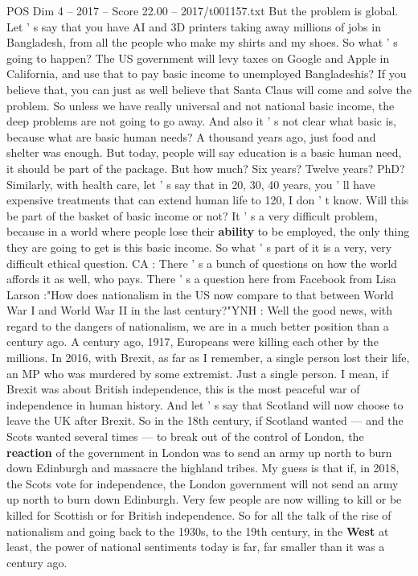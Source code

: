 \begin{textsample}{POS Dim 4 – 2017 – Score 22.00 – 2017/t001157.txt}
But the problem is global.
Let ' s say that you have AI and 3D printers taking away millions of jobs in Bangladesh, from all the people who make my shirts and my shoes.
So what ' s going to happen?
The US government will levy taxes on Google and Apple in California, and use that to pay basic income to unemployed Bangladeshis?
If you believe that, you can just as well believe that Santa Claus will come and solve the problem.
So unless we have really universal and not national basic income, the deep problems are not going to go away.
And also it ' s not clear what basic is, because what are basic human needs?
A thousand years ago, just food and shelter was enough.
But today, people will say education is a basic human need, it should be part of the package.
But how much?
Six years?
Twelve years?
PhD?
Similarly, with health care, let ' s say that in 20, 30, 40 years, you ' ll have expensive treatments that can extend human life to 120, I don ' t know.
Will this be part of the basket of basic income or not?
It ' s a very difficult problem, because in a world where people lose their \textbf{ability} to be employed, the only thing they are going to get is this basic income.
So what ' s part of it is a very, very difficult ethical question.
CA : There ' s a bunch of questions on how the world affords it as well, who pays.
There ' s a question here from Facebook from Lisa Larson :"How does nationalism in the US now compare to that between World War I and World War II in the last century?"YNH : Well the good news, with regard to the dangers of nationalism, we are in a much better position than a century ago.
A century ago, 1917, Europeans were killing each other by the millions.
In 2016, with Brexit, as far as I remember, a single person lost their life, an MP who was murdered by some extremist.
Just a single person.
I mean, if Brexit was about British independence, this is the most peaceful war of independence in human history.
And let ' s say that Scotland will now choose to leave the UK after Brexit.
So in the 18th century, if Scotland wanted — and the Scots wanted several times — to break out of the control of London, the \textbf{reaction} of the government in London was to send an army up north to burn down Edinburgh and massacre the highland tribes.
My guess is that if, in 2018, the Scots vote for independence, the London government will not send an army up north to burn down Edinburgh.
Very few people are now willing to kill or be killed for Scottish or for British independence.
So for all the talk of the rise of nationalism and going back to the 1930s, to the 19th century, in the \textbf{West} at least, the power of national sentiments today is far, far smaller than it was a century ago.

\end{textsample}
